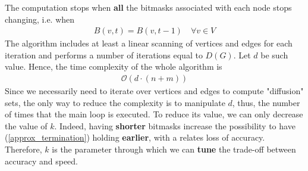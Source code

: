 \medskip
\noindent The computation stops when \textbf{all} the bitmasks associated with each node stops changing, i.e. when
\begin{align}
B(v,t) = B(v, t-1) \quad \forall v \in V \label{approx_termination}
\end{align}
The algorithm includes at least a linear scanning of vertices and edges for each iteration and performs a number of iterations equal to $D(G)$. Let $d$ be such value. Hence, the time complexity of the whole algorithm is
\begin{align*}
\mathcal{O}(d \cdot (n + m))
\end{align*}
Since we necessarily need to iterate over vertices and edges to compute "diffusion" sets, the only way to reduce the complexity is to manipulate $d$, thus, the number of times that the main loop is executed. To reduce its value, we can only decrease the value of $k$. Indeed, having \textbf{shorter} bitmasks increase the possibility to have (\ref{approx_termination}) holding \textbf{earlier}, with a relates loss of accuracy. Therefore, $k$ is the parameter through which we can \textbf{tune} the trade-off between accuracy and speed.

